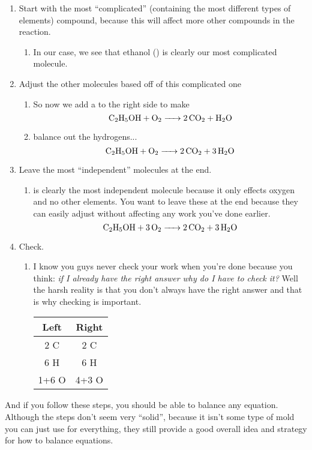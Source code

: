 \begin{enumerate}
    \item Start with the most ``complicated'' (containing the most different types of elements) compound, because this will affect more other compounds in the reaction.
    \begin{enumerate}
        \item In our case, we see that ethanol () is clearly our most complicated molecule.
    \end{enumerate}
    \item Adjust the other molecules based off of this complicated one
        \begin{enumerate}
            \item So now we add a  to the right side to make $$\ce{C2H5OH + O2 -> 2CO2 + H2O}$$
            \item balance out the hydrogens...
            $$\ce{C2H5OH + O2 -> 2CO2 + 3H2O}$$
        \end{enumerate}
    \item Leave the most ``independent'' molecules at the end. 
        \begin{enumerate}
            \item {} is clearly the most independent molecule because it only effects oxygen and no other elements. You want to leave these at the end because they can easily adjust without affecting any work you've done earlier.
            $$\ce{C2H5OH + 3O2 -> 2CO2 + 3H2O}$$
        \end{enumerate}
    \item Check.
        \begin{enumerate}
            \item I know you guys never check your work when you're done because you think: \textit{if I already have the right answer why do I have to check it?} Well the harsh reality is that you don't always have the right answer and that is why checking is important.
            \begin{center}
                \begin{tabular}{c|c}
                    Left & Right \\
                    \hline
                     2 C & 2 C\\
                     6 H & 6 H\\
                     1+6 O & 4+3 O \\
                \end{tabular}
            \end{center}
        \end{enumerate}
    \end{enumerate}
    And if you follow these steps, you should be able to balance any equation. Although the steps don't seem very ``solid'', because it isn't some type of mold you can just use for everything, they still provide a good overall idea and strategy for how to balance equations.
